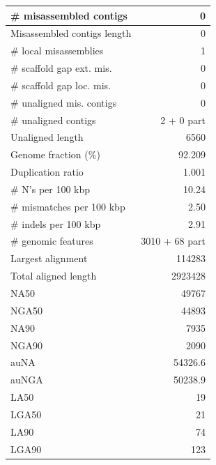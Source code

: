 \documentclass[12pt,a4paper]{article}
\begin{document}
\begin{table}[ht]
\begin{center}
\begin{tabular}{|l*{1}{|r}|}
\# misassembled contigs & 0 \\ \hline
Misassembled contigs length & 0 \\ \hline
\# local misassemblies & 1 \\ \hline
\# scaffold gap ext. mis. & 0 \\ \hline
\# scaffold gap loc. mis. & 0 \\ \hline
\# unaligned mis. contigs & 0 \\ \hline
\# unaligned contigs & 2 + 0 part \\ \hline
Unaligned length & 6560 \\ \hline
Genome fraction (\%) & 92.209 \\ \hline
Duplication ratio & 1.001 \\ \hline
\# N's per 100 kbp & 10.24 \\ \hline
\# mismatches per 100 kbp & 2.50 \\ \hline
\# indels per 100 kbp & 2.91 \\ \hline
\# genomic features & 3010 + 68 part \\ \hline
Largest alignment & 114283 \\ \hline
Total aligned length & 2923428 \\ \hline
NA50 & 49767 \\ \hline
NGA50 & 44893 \\ \hline
NA90 & 7935 \\ \hline
NGA90 & 2090 \\ \hline
auNA & 54326.6 \\ \hline
auNGA & 50238.9 \\ \hline
LA50 & 19 \\ \hline
LGA50 & 21 \\ \hline
LA90 & 74 \\ \hline
LGA90 & 123 \\ \hline
\end{tabular}
\end{center}
\end{table}
\end{document}
